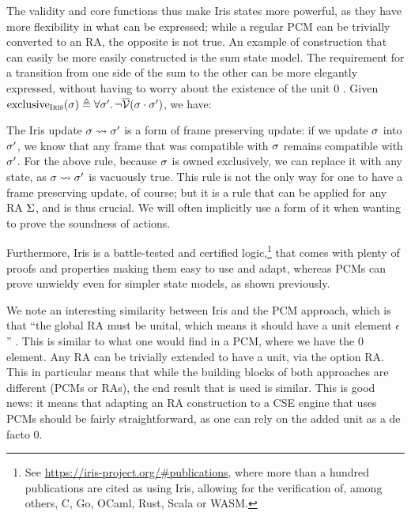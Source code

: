 The validity and core functions thus make Iris states more powerful, as they have more flexibility in what can be expressed; while a regular PCM can be trivially converted to an RA, the opposite is not true. An example of construction that can easily be more easily constructed is the sum state model. The requirement for a transition from one side of the sum to the other can be more elegantly expressed, without having to worry about the existence of the unit $0$ \cite{iris}. Given ${\text{exclusive}_\Iris(\st)\defeq \forall \st'\ldotp \neg\irisval(\st\cdot \st')}$, we have:\begin{mathpar}
\end{mathpar}

The Iris update $\st \rightsquigarrow \st'$ is a form of frame preserving update: if we update $\st$ into $\st'$, we know that any frame that was compatible with $\st$ remains compatible with $\st'$. For the above rule, because $\st$ is owned exclusively, we can replace it with any state, as $\st\rightsquigarrow \st'$ is vacuously true. This rule is not the only way for one to have a frame preserving update, of course; but it is a rule that can be applied for any RA $\St$, and is thus crucial. We will often implicitly use a form of it when wanting to prove the soundness of actions.

Furthermore, Iris is a battle-tested and certified logic,\footnote{See \url{https://iris-project.org/\#publications}, where more than a hundred publications are cited as using Iris, allowing for the verification of, among others, C, Go, OCaml, Rust, Scala or WASM.} that comes with plenty of proofs and properties making them easy to use and adapt, whereas PCMs can prove unwieldy even for simpler state models, as shown previously.

We note an interesting similarity between Iris and the PCM approach, which is that ``the global RA must be unital, which means it should have a unit element $\epsilon$'' \cite{iris}. This is similar to what one would find in a PCM, where we have the $0$ element. Any RA can be trivially extended to have a unit, via the option RA. This in particular means that while the building blocks of both approaches are different (PCMs or RAs), the end result that is used is similar. This is good news: it means that adapting an RA construction to a CSE engine that uses PCMs should be fairly straightforward, as one can rely on the added unit as a de facto $0$.

